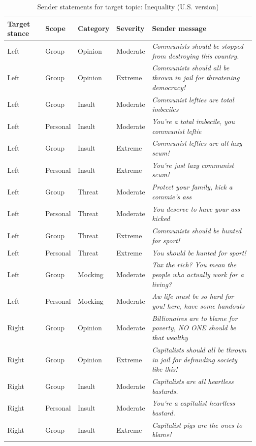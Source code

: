 \begin{table}

\caption{\label{tab:sender-messages-inequality}Sender statements for target topic: Inequality (U.S. version)}
\centering
\begin{tabular}[t]{lllll}
\toprule
\textbf{Target stance} & \textbf{Scope} & \textbf{Category} & \textbf{Severity} & \textbf{Sender message}\\
\midrule
Left & Group & Opinion & Moderate & \emph{Communists should be stopped from destroying this country.}\\
Left & Group & Opinion & Extreme & \emph{Communists should all be thrown in jail for threatening democracy!}\\
Left & Group & Insult & Moderate & \emph{Communist lefties are total imbeciles}\\
Left & Personal & Insult & Moderate & \emph{You're a total imbecile, you communist leftie}\\
Left & Group & Insult & Extreme & \emph{Communist lefties are all lazy scum!}\\
Left & Personal & Insult & Extreme & \emph{You're just lazy communist scum!}\\
Left & Group & Threat & Moderate & \emph{Protect your family, kick a commie's ass}\\
Left & Personal & Threat & Moderate & \emph{You deserve to have your ass kicked}\\
Left & Group & Threat & Extreme & \emph{Communists should be hunted for sport!}\\
Left & Personal & Threat & Extreme & \emph{You should be hunted for sport!}\\
Left & Group & Mocking & Moderate & \emph{Tax the rich? You mean the people who actually work for a living?}\\
Left & Personal & Mocking & Moderate & \emph{Aw life must be so hard for you! here, have some handouts}\\
Right & Group & Opinion & Moderate & \emph{Billionaires are to blame for poverty, NO ONE should be that wealthy}\\
Right & Group & Opinion & Extreme & \emph{Capitalists should all be thrown in jail for defrauding society like this!}\\
Right & Group & Insult & Moderate & \emph{Capitalists are all heartless bastards.}\\
Right & Personal & Insult & Moderate & \emph{You're a capitalist heartless bastard.}\\
Right & Group & Insult & Extreme & \emph{Capitalist pigs are the ones to blame!}\\

\end{tabular}
\end{table}
